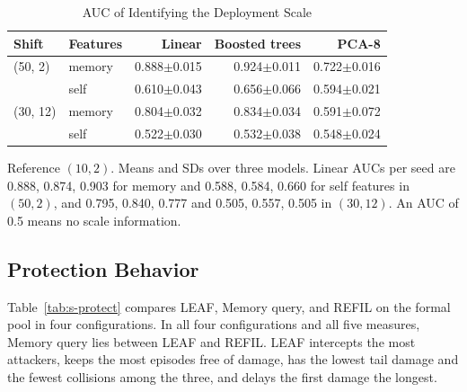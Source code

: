 \begin{table}[!t]
\centering
\scriptsize
\setlength{\tabcolsep}{3pt}
\caption{AUC of Identifying the Deployment Scale}
\label{tab:s-drift}
\begin{tabular}{@{}llrrr@{}}
\toprule
Shift & Features & Linear & Boosted trees & PCA-8\\
\midrule
(50, 2) & memory & 0.888$\pm$0.015 & 0.924$\pm$0.011 & 0.722$\pm$0.016\\
 & self & 0.610$\pm$0.043 & 0.656$\pm$0.066 & 0.594$\pm$0.021\\
(30, 12) & memory & 0.804$\pm$0.032 & 0.834$\pm$0.034 & 0.591$\pm$0.072\\
 & self & 0.522$\pm$0.030 & 0.532$\pm$0.038 & 0.548$\pm$0.024\\
\bottomrule
\end{tabular}
\par\smallskip
\parbox{\columnwidth}{\scriptsize Reference $(10,2)$. Means and SDs over three models. Linear AUCs per seed are 0.888, 0.874, 0.903 for memory and 0.588, 0.584, 0.660 for self features in $(50,2)$, and 0.795, 0.840, 0.777 and 0.505, 0.557, 0.505 in $(30,12)$. An AUC of 0.5 means no scale information.}
\end{table}

\subsection{Protection Behavior}
Table~\ref{tab:s-protect} compares LEAF, Memory query, and REFIL on the formal pool in four configurations. In all four configurations and all five measures, Memory query lies between LEAF and REFIL. LEAF intercepts the most attackers, keeps the most episodes free of damage, has the lowest tail damage and the fewest collisions among the three, and delays the first damage the longest.

